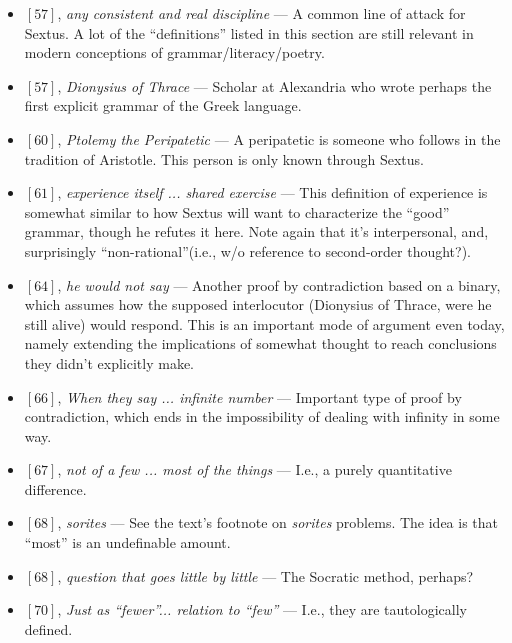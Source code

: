\documentclass[12pt]{article}
\begin{document}
\begin{itemize}

\item $[57]$, \textit{any consistent and real discipline} --- A common line of attack for Sextus. A lot of the ``definitions'' listed in this section are still relevant in modern conceptions of grammar/literacy/poetry.

\item $[57]$, \textit{Dionysius of Thrace} --- Scholar at Alexandria who wrote perhaps the first explicit grammar of the Greek language.

\item $[60]$, \textit{Ptolemy the Peripatetic} --- A peripatetic is someone who follows in the tradition of Aristotle. This person is only known through Sextus.

\item $[61]$, \textit{experience itself ... shared exercise} --- This definition of experience is somewhat similar to how Sextus will want to characterize the ``good'' grammar, though he refutes it here. Note again that it's interpersonal, and, surprisingly ``non-rational''(i.e., w/o reference to second-order thought?).

\item $[64]$, \textit{he would not say} --- Another proof by contradiction based on a binary, which assumes how the supposed interlocutor (Dionysius of Thrace, were he still alive) would respond. This is an important mode of argument even today, namely extending the implications of somewhat thought to reach conclusions they didn't explicitly make.

\item $[66]$, \textit{When they say ... infinite number} --- Important type of proof by contradiction, which ends in the impossibility of dealing with infinity in some way.

\item $[67]$, \textit{not of a few ... most of the things} --- I.e., a purely quantitative difference.

\item $[68]$, \textit{sorites} --- See the text's footnote on \textit{sorites} problems. The idea is that ``most'' is an undefinable amount.

\item $[68]$, \textit{question that goes little by little} --- The Socratic method, perhaps?

\item $[70]$, \textit{Just as ``fewer''... relation to ``few''} --- I.e., they are tautologically defined.


\end{itemize}
\end{document}
